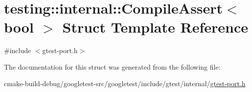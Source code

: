 \hypertarget{structtesting_1_1internal_1_1CompileAssert}{}\section{testing\+::internal\+::Compile\+Assert$<$ bool $>$ Struct Template Reference}
\label{structtesting_1_1internal_1_1CompileAssert}


{\ttfamily \#include $<$gtest-\/port.\+h$>$}



The documentation for this struct was generated from the following file\+:\begin{DoxyCompactItemize}
\item 
cmake-\/build-\/debug/googletest-\/src/googletest/include/gtest/internal/\mbox{\hyperlink{gtest-port_8h}{gtest-\/port.\+h}}\end{DoxyCompactItemize}
